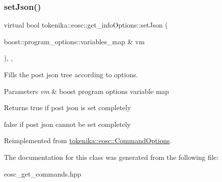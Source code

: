 \mbox{\label{classtokenika_1_1eosc_1_1get__info_options_a8731c87cc2429a975e87ce36dd7fcf68}} 
\subsubsection{\texorpdfstring{set\+Json()}{setJson()}}
{\footnotesize\ttfamily virtual bool tokenika\+::eosc\+::get\+\_\+info\+Options\+::set\+Json (\begin{DoxyParamCaption}\item[{boost\+::program\+\_\+options\+::variables\+\_\+map \&}]{vm }\end{DoxyParamCaption})\hspace{0.3cm}{\ttfamily [inline]}, {\ttfamily [protected]}, {\ttfamily [virtual]}}



Fills the post json tree according to options. 


\begin{DoxyParams}{Parameters}
{\em vm} & boost program options variable map \\
\hline
\end{DoxyParams}
\begin{DoxyReturn}{Returns}
true if post json is set completely 

false if post json cannot be set completely 
\end{DoxyReturn}


Reimplemented from \hyperlink{classtokenika_1_1eosc_1_1_command_options_a7aecc9aa79ca65f6abbd568ff8ff77a7}{tokenika\+::eosc\+::\+Command\+Options}.



The documentation for this class was generated from the following file\+:\begin{DoxyCompactItemize}
\item 
eosc\+\_\+get\+\_\+commands.\+hpp\end{DoxyCompactItemize}
